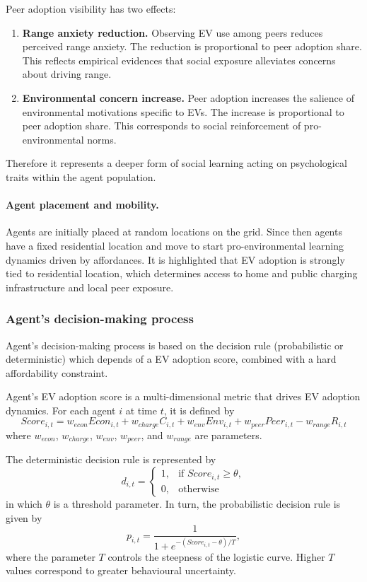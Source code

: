 \documentclass[11pt]{article}
\begin{document}
Peer adoption visibility has two effects:
\begin{enumerate}
\item \textbf{Range anxiety reduction.} Observing EV use among peers reduces
  perceived range anxiety. The reduction is proportional to peer adoption
  share. This reflects empirical evidences that social exposure alleviates
  concerns about driving range.
\item \textbf{Environmental concern increase.} Peer adoption increases the
  salience of environmental motivations specific to EVs. The increase is
  proportional to peer adoption share. This corresponds to social
  reinforcement of pro-environmental norms.
\end{enumerate}
Therefore it represents a deeper form of social learning acting on
psychological traits within the agent population.

\paragraph{Agent placement and mobility.} Agents are initially placed at
random locations on the grid. Since then agents have a fixed residential
location and move to start pro-environmental learning dynamics driven by
affordances. It is highlighted that EV adoption is strongly tied to
residential location, which determines access to home and public charging
infrastructure and local peer exposure.

\subsubsection{Agent's decision-making process}
\label{sec:decision}

Agent's decision-making process is based on the decision rule (probabilistic
or deterministic) which depends of a EV adoption score, combined with a hard
affordability constraint.

Agent's EV adoption score is a multi-dimensional metric that drives EV
adoption dynamics. For each agent $i$ at time $t$, it is defined by
\begin{equation}
Score_{i,t} = w_{econ} Econ_{i,t} + w_{charge} C_{i,t} + w_{env} Env_{i,t}
            + w_{peer} Peer_{i,t} - w_{range} R_{i,t}
\end{equation}
where $w_{econ}$, $w_{charge}$, $w_{env}$, $w_{peer}$, and $w_{range}$ are
parameters.

The deterministic decision rule is represented by
\begin{equation}
d_{i,t} =
\begin{cases}
1, & \text{if } Score_{i,t} \geq \theta,\\
0, & \text{otherwise}
\end{cases}
\end{equation}
in which $\theta$ is a threshold parameter. In turn, the probabilistic
decision rule is given by
\begin{equation}
p_{i,t} = \frac{1}{1+e^{-(Score_{i,t}-\theta)/T}},
\end{equation}
where the parameter $T$ controls the steepness of the logistic curve. Higher
$T$ values correspond to greater behavioural uncertainty.
\end{document}
